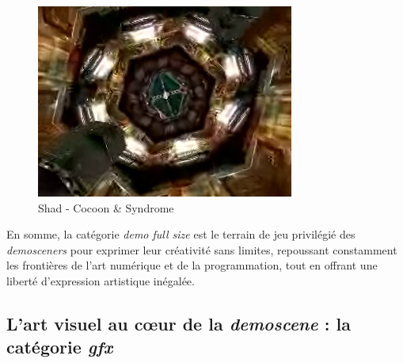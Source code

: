 \begin{figure}[h]
\begin{minipage}[b]{0.30\linewidth}
    \includegraphics[width=\linewidth]{images/demoscene/demos/shad3.png}
  \end{minipage}
  \caption{Shad - Cocoon \& Syndrome}
  \label{shad}
\end{figure}



En somme, la catégorie \textit{demo full size} est le terrain de jeu privilégié des \textit{demosceners} pour exprimer leur créativité sans limites, repoussant constamment les frontières de l'art numérique et de la programmation, tout en offrant une liberté d'expression artistique inégalée.


\subsection*{L'art visuel au cœur de la \textit{demoscene} : la catégorie \textit{gfx}}

